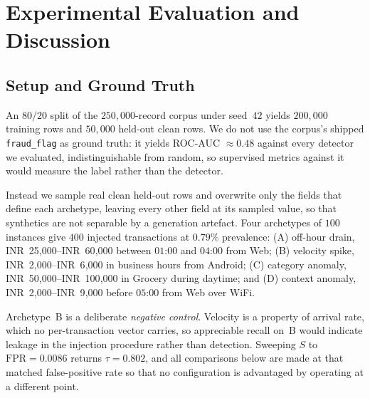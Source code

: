 \documentclass[conference]{IEEEtran}
\newcommand{\INR}[1]{\mbox{INR~#1}}
\begin{document}
\section{Experimental Evaluation and Discussion}
\label{sec:evaluation}

\subsection{Setup and Ground Truth}

An $80/20$ split of the $250{,}000$-record corpus under seed~$42$
yields $200{,}000$ training rows and $50{,}000$ held-out clean rows. We
do not use the corpus's shipped \texttt{fraud\_flag} as ground truth:
it yields ROC-AUC $\approx 0.48$ against every detector we evaluated,
indistinguishable from random, so supervised metrics against it would
measure the label rather than the detector.

Instead we sample real clean held-out rows and overwrite only the
fields that define each archetype, leaving every other field at its
sampled value, so that synthetics are not separable by a generation
artefact. Four archetypes of $100$ instances give $400$ injected
transactions at $0.79\%$ prevalence: (A) off-hour drain,
\INR{25{,}000}--\INR{60{,}000} between $01$:$00$ and $04$:$00$ from
Web; (B) velocity spike, \INR{2{,}000}--\INR{6{,}000} in business hours
from Android; (C) category anomaly, \INR{50{,}000}--\INR{100{,}000} in
Grocery during daytime; and (D) context anomaly,
\INR{2{,}000}--\INR{9{,}000} before $05$:$00$ from Web over WiFi.

Archetype~B is a deliberate \emph{negative control}. Velocity is a
property of arrival rate, which no per-transaction vector carries, so
appreciable recall on~B would indicate leakage in the injection
procedure rather than detection. Sweeping $S$ to
$\mathrm{FPR} = 0.0086$ returns $\tau = 0.802$, and all comparisons
below are made at that matched false-positive rate so that no
configuration is advantaged by operating at a different point.
\end{document}
